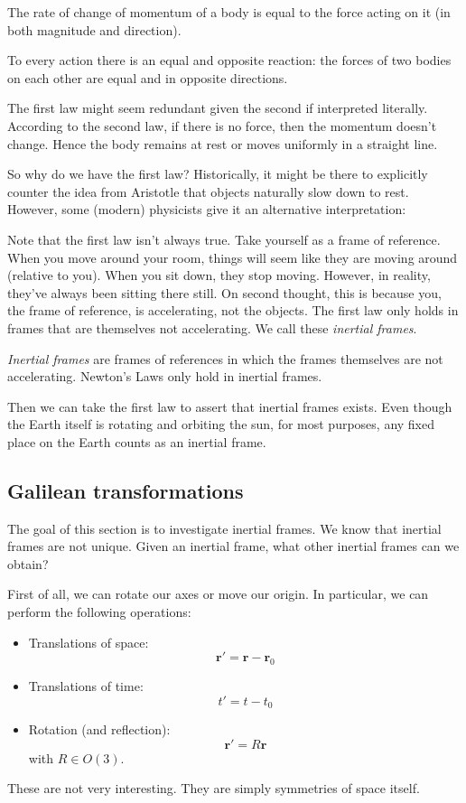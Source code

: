 \documentclass[a4paper]{article}
\begin{document}
\begin{law}
   The rate of change of momentum of a body is equal to the force acting on it (in both magnitude and direction).
\end{law}

\begin{law}
  To every action there is an equal and opposite reaction: the forces of two bodies on each other are equal and in opposite directions.
\end{law}
The first law might seem redundant given the second if interpreted literally. According to the second law, if there is no force, then the momentum doesn't change. Hence the body remains at rest or moves uniformly in a straight line.

So why do we have the first law? Historically, it might be there to explicitly counter the idea from Aristotle that objects naturally slow down to rest. However, some (modern) physicists give it an alternative interpretation:

Note that the first law isn't always true. Take yourself as a frame of reference. When you move around your room, things will seem like they are moving around (relative to you). When you sit down, they stop moving. However, in reality, they've always been sitting there still. On second thought, this is because you, the frame of reference, is accelerating, not the objects. The first law only holds in frames that are themselves not accelerating. We call these \emph{inertial frames}.
\begin{defi}
  \emph{Inertial frames} are frames of references in which the frames themselves are not accelerating. Newton's Laws only hold in inertial frames.
\end{defi}
Then we can take the first law to assert that inertial frames exists. Even though the Earth itself is rotating and orbiting the sun, for most purposes, any fixed place on the Earth counts as an inertial frame.

\subsection{Galilean transformations}
The goal of this section is to investigate inertial frames. We know that inertial frames are not unique. Given an inertial frame, what other inertial frames can we obtain?

First of all, we can rotate our axes or move our origin. In particular, we can perform the following operations:
\begin{itemize}
  \item Translations of space:
    \[
      \mathbf{r}' = \mathbf{r} - \mathbf{r}_0
    \]
  \item Translations of time:
    \[
      t' = t - t_0
    \]
  \item Rotation (and reflection):
    \[
      \mathbf{r}' = R\mathbf{r}
    \]
    with $R\in O(3)$.
\end{itemize}
These are not very interesting. They are simply symmetries of space itself.
\end{document}
